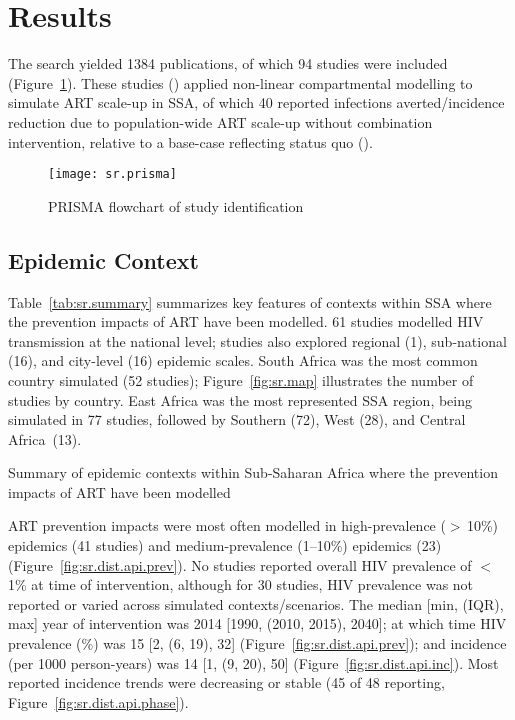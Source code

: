 \section{Results}\label{sr.res}
The search yielded 1384 publications,
of which 94 studies were included (Figure~\ref{fig:sr.prisma}).
These studies ()
applied non-linear compartmental modelling to simulate ART scale-up in SSA,
of which 40 reported infections averted/incidence reduction
due to population-wide ART scale-up without combination intervention,
relative to a base-case reflecting status quo ().
\begin{figure}
  \centering
  \texttt{[image: sr.prisma]}
  \caption{PRISMA flowchart of study identification}
  \label{fig:sr.prisma}
\end{figure}
\subsection{Epidemic Context}\label{sr.res.context}
Table~\ref{tab:sr.summary} summarizes key features of contexts within SSA
where the prevention impacts of ART have been modelled.
61 studies modelled HIV transmission at the national level;
studies also explored
regional (1), sub-national (16), and city-level (16) epidemic scales.
South Africa was the most common country simulated (52 studies);
Figure~\ref{fig:sr.map} illustrates the number of studies by country.
East Africa was the most represented SSA region, being simulated in 77 studies,
followed by Southern (72), West (28), and Central Africa~(13).
\begin{table}
  \centering
  \caption{Summary of epidemic contexts within Sub-Saharan Africa where
    the prevention impacts of ART have been modelled}
  \label{tab:sr.summary}
  
\end{table}
\par
ART prevention impacts were most often modelled in
high-prevalence ({$>$\,10\%}) epidemics (41 studies) and
medium-prevalence ({1--10\%}) epidemics (23) (Figure~\ref{fig:sr.dist.api.prev}).
No studies reported overall HIV prevalence of {$<$\,1\%} at time of intervention,
although for 30 studies, HIV prevalence was
not reported or varied across simulated contexts/scenarios.
The median [min, (IQR), max] year of intervention was 2014 [1990, (2010, 2015), 2040]; at which time
HIV prevalence (\%) was 15 [2, (6, 19), 32] (Figure~\ref{fig:sr.dist.api.prev}); and
incidence (per 1000 person-years) was 14 [1, (9, 20), 50] (Figure~\ref{fig:sr.dist.api.inc}).
Most reported incidence trends were decreasing or stable
(45 of 48 reporting, Figure~\ref{fig:sr.dist.api.phase}).
